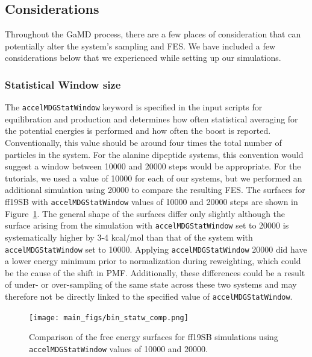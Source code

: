 \documentclass[9pt,tutorial]{livecoms}
\begin{document}
\subsection{Considerations}
Throughout the GaMD process, there are a few places of consideration that can potentially alter the system's sampling and FES. We have included a few considerations below that we experienced while setting up our simulations.

\subsubsection{Statistical Window size} 
The \texttt{accelMDGStatWindow} keyword is specified in the input scripts for equilibration and production and determines how often statistical averaging for the potential energies is performed and how often the boost is reported. Conventionally, this value should be around four times the total number of particles in the system. For the alanine dipeptide systems, this convention would suggest a window between 10000 and 20000 steps would be appropriate. For the tutorials, we used a value of 10000 for each of our systems, but we performed an additional simulation using 20000 to compare the resulting FES. The surfaces for ff19SB with \texttt{accelMDGStatWindow} values of 10000 and 20000 steps are shown in Figure~\ref{fig:binstatw}. The general shape of the surfaces differ only slightly although the surface arising from the simulation with \texttt{accelMDGStatWindow} set to 20000 is systematically higher by 3-4 kcal/mol than that of  the system with \texttt{accelMDGStatWindow} set to 10000. Applying \texttt{accelMDGStatWindow} 20000 did have a lower energy minimum prior to normalization during reweighting, which could be the cause of the shift in PMF. Additionally, these differences could be a result of under- or over-sampling of the same state across these two systems and may therefore not be directly linked to the specified value of \texttt{accelMDGStatWindow}. 

\begin{figure}[h]
    \texttt{[image: main\_figs/bin\_statw\_comp.png]}
    \caption{Comparison of the free energy surfaces for ff19SB simulations using \texttt{accelMDGStatWindow} values of 10000 and 20000.}
    \label{fig:binstatw}
\end{figure}
\end{document}

